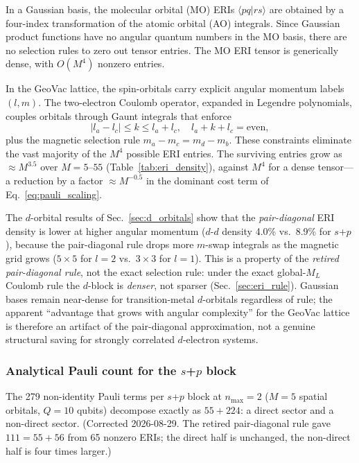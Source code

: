 \documentclass[aps,pra,twocolumn,superscriptaddress,longbibliography]{revtex4-2}
\newcommand{\gvq}[2]{#2}
\begin{document}
In a Gaussian basis, the molecular orbital (MO) ERIs
$\langle pq | rs \rangle$ are obtained by a four-index transformation of
the atomic orbital (AO) integrals.  Since Gaussian product functions have
no angular quantum numbers in the MO basis, there are no selection rules
to zero out tensor entries.  The MO ERI tensor is generically dense,
with $O(M^4)$ nonzero entries.

In the GeoVac lattice, the spin-orbitals carry explicit angular momentum
labels $(l, m)$.  The two-electron Coulomb operator, expanded in Legendre
polynomials, couples orbitals through Gaunt integrals that enforce
\begin{equation}
  |l_a - l_c| \le k \le l_a + l_c, \quad
  l_a + k + l_c = \text{even},
\end{equation}
plus the magnetic selection rule $m_a - m_c = m_d - m_b$.  These
constraints eliminate the vast majority of the $M^4$ possible ERI entries.
The surviving entries grow as $\approx M^{3.5}$ over $M = 5$--$55$
(Table~\ref{tab:eri_density}), against $M^4$ for a dense tensor---a
reduction by a factor $\approx M^{-0.5}$ in the dominant cost term of
Eq.~\eqref{eq:pauli_scaling}.

The $d$-orbital results of Sec.~\ref{sec:d_orbitals} show that the
\emph{pair-diagonal} ERI density is lower at higher angular momentum
($d$-$d$ density 4.0\% vs.\ 8.9\% for $s$+$p$), because the pair-diagonal
rule drops more $m$-swap integrals as the magnetic grid grows
($5 \times 5$ for $l = 2$ vs.\ $3 \times 3$ for $l = 1$).  This is a
property of the \emph{retired pair-diagonal rule}, not the exact
selection rule: under the exact global-$M_L$ Coulomb rule the $d$-block
is \emph{denser}, not sparser (Sec.~\ref{sec:eri_rule}).  Gaussian bases
remain near-dense for transition-metal $d$-orbitals regardless of rule;
the apparent ``advantage that grows with angular complexity'' for the
GeoVac lattice is therefore an artifact of the pair-diagonal approximation,
not a genuine structural saving for strongly correlated $d$-electron systems.

\subsubsection{Analytical Pauli count for the $s$+$p$ block}
\label{sec:block_pauli_count}

The \gvq{block_sp_n2_pauli}{279} non-identity Pauli terms per $s$+$p$ block at $n_{\max}=2$ ($M=5$
spatial orbitals, $Q=10$ qubits) decompose exactly as $55 + 224$: a direct
sector and a non-direct sector.  (Corrected 2026-08-29.  The retired
pair-diagonal rule gave $111 = 55 + 56$ from 65 nonzero ERIs; the direct
half is unchanged, the non-direct half is four times larger.)
\end{document}
